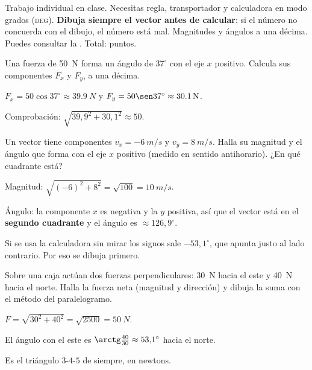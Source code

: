\documentclass[11pt]{article}
\begin{document}
\encabezado

\begin{instrucciones}
Trabajo individual en clase. Necesitas regla, transportador y calculadora en modo grados
(\textsc{deg}). \textbf{Dibuja siempre el vector antes de calcular}: si el número no concuerda
con el dibujo, el número está mal. Magnitudes y ángulos a una décima. Puedes consultar la
. Total: \totalpuntos{} puntos.
\end{instrucciones}

\begin{preguntas}

\pregunta[1] Una fuerza de \qty{50}{N} forma un ángulo de $37^\circ$ con el eje $x$ positivo.
Calcula sus componentes $F_x$ y $F_y$, a una décima.
\begin{solucion}[3cm]
$F_x = 50\cos 37^\circ \approx \qty{39,9}{N}$ y $F_y = 50\sen 37^\circ \approx \qty{30,1}{N}$.

Comprobación: $\sqrt{39{,}9^2 + 30{,}1^2} \approx 50$.
\end{solucion}

\pregunta[1.5] Un vector tiene componentes $v_x = \qty{-6}{m/s}$ y $v_y = \qty{8}{m/s}$. Halla
su magnitud y el ángulo que forma con el eje $x$ positivo (medido en sentido antihorario).
¿En qué cuadrante está?
\begin{solucion}[4.5cm]
Magnitud: $\sqrt{(-6)^2 + 8^2} = \sqrt{100} = \qty{10}{m/s}$.

Ángulo: la componente $x$ es negativa y la $y$ positiva, así que el vector está en el
\textbf{segundo cuadrante} y el ángulo es $\approx 126{,}9^\circ$.

Si se usa la calculadora sin mirar los signos sale $-53{,}1^\circ$, que apunta justo al lado
contrario. Por eso se dibuja primero.
\end{solucion}

\pregunta[1.5] Sobre una caja actúan dos fuerzas perpendiculares: \qty{30}{N} hacia el este y
\qty{40}{N} hacia el norte. Halla la fuerza neta (magnitud y dirección) y dibuja la suma con
el método del paralelogramo.
\begin{solucion}[5cm]
$F = \sqrt{30^2 + 40^2} = \sqrt{2500} = \qty{50}{N}$.

El ángulo con el este es $\arctg\frac{40}{30} \approx 53{,}1^\circ$ hacia el norte.

Es el triángulo $3$-$4$-$5$ de siempre, en newtons.
\end{solucion}


\end{preguntas}
\end{document}

